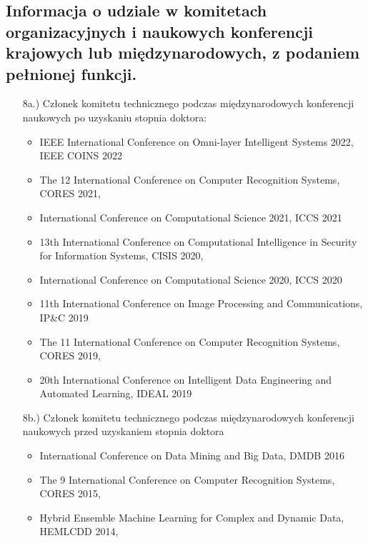 \begin{fullwidth}
	

\subsection{Informacja o udziale w komitetach organizacyjnych i naukowych konferencji krajowych lub międzynarodowych, z podaniem pełnionej funkcji.}

\begin{itemize}
		\item[8a.)] Członek komitetu technicznego podczas międzynarodowych konferencji naukowych po uzyskaniu stopnia doktora:
		
		\begin{itemize}
			\item IEEE International Conference on Omni-layer Intelligent Systems 2022, IEEE COINS 2022
			\item The 12 International Conference on Computer Recognition Systems, CORES 2021,
			\item International Conference on Computational Science 2021, ICCS 2021
			\item 13th International Conference on Computational Intelligence in Security for Information Systems, CISIS 2020,
			\item International Conference on Computational Science 2020, ICCS 2020
			\item 11th International Conference on Image Processing and Communications, IP\&C 2019
			\item The 11 International Conference on Computer Recognition Systems, CORES 2019,
			\item 20th International Conference on Intelligent Data Engineering and Automated Learning, IDEAL 2019
		\end{itemize}
		
		\item[8b.)] Członek komitetu technicznego podczas międzynarodowych konferencji naukowych przed uzyskaniem stopnia doktora
		
		\begin{itemize}
			\item International Conference on Data Mining and Big Data, DMDB 2016
			\item The 9 International Conference on Computer Recognition Systems, CORES 2015,
			\item Hybrid Ensemble Machine Learning for Complex and Dynamic Data, HEMLCDD 2014,
		\end{itemize}



\end{itemize}
\end{fullwidth}

